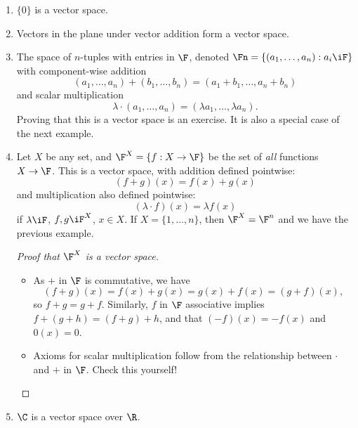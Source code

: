 	\pagebreak


\begin{examples}
\begin{enumerate}
	\shortskip
	\item $\{0\}$ is a vector space.
	\item Vectors in the plane under vector addition form a vector space.
	\item The space of $n$-tuples with entries in $\F$, denoted $\Fn = \left\{ \left( a_1,\ldots,a_n \right) : a_i \iF\right\}$ with component-wise addition \vspace{-2pt} %
	\begin{equation*}
		\left( a_1,\ldots,a_n \right)
		+ \left( b_1,\ldots,b_n \right)
		= \left( a_1+b_1,\ldots,a_n+b_n \right)
	\end{equation*}
	and scalar multiplication
	\begin{equation*}
		\lambda \cdot \left( a_1,\ldots,a_n \right)
		= \left( \lambda a_1,\ldots,\lambda a_n \right).
	\end{equation*}
	Proving that this is a vector space is an exercise. It is also a special case of the next example.
		
	\item Let $X$ be any set, and $\F^X = \left\{f:X\to\F\right\}$ be the set of \emph{all} functions $X\to\F$. This is a vector space, with addition defined pointwise: %
	\begin{equation*}
		(f+g)(x)=f(x)+g(x)
	\end{equation*}
	and multiplication also defined pointwise:
	\begin{equation*}
		(\lambda\cdot f)(x)=\lambda f(x)
	\end{equation*}
	if $\lambda\iF$, $f,g\iF^X$, $x\in X$. If $X=\{1,\ldots,n\}$, then $\F^X=\F^n$ and we have the previous example.

	\vspace{3pt}
	
	\begin{proof}
		[Proof that $\F^X$ is a vector space]
		\mbox{}
		\begin{itemize}
			\shortskip
			\item As $+$ in $\F$ is commutative, we have
			\begin{equation*}
				(f+g)(x) = f(x) + g(x) = g(x) + f(x) = (g+f)(x),
			\end{equation*}
			so $f+g=g+f$. Similarly, $f$ in $\F$ associative implies $f + (g + h) = (f + g) + h$, and that $(-f)(x)=-f(x)$ and $0(x)=0$. %
			
			\item Axioms for scalar multiplication follow from the relationship between $\cdot$ and $+$ in $\F$. Check this yourself! \qedhere %
		\end{itemize}
	\end{proof}
         
         \item $\C$ is a vector space over $\R$.

\end{enumerate} %
\end{examples}


